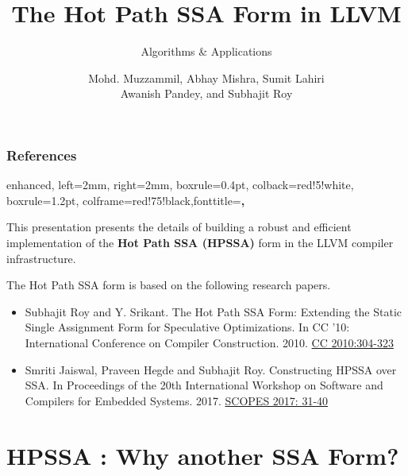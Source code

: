 \documentclass[aspectratio=169, compress]{beamer}
\title[Hot Path SSA in LLVM] %
{The Hot Path SSA Form in LLVM}
\subtitle{Algorithms \& Applications}
\author[Muzzammil, Mishra, Lahiri, Pandey, and Roy] %
{Mohd. Muzzammil\inst{1}, Abhay Mishra\inst{1}, Sumit Lahiri\inst{1} \\ Awanish Pandey\inst{2}, and Subhajit Roy\inst{1}}
\institute[IDK] %
{
	\inst{1}%
	Dept. Of Computer Science \& Engineering,
	IIT Kanpur \\
	\inst{2}%
	Qualcomm
}
\date[01/03/2022] %
\begin{document}
\frame{\titlepage}
\begin{frame}
	\frametitle{References}
	\tcbset
	{
		enhanced,
		left=2mm,
		right=2mm,
		boxrule=0.4pt,
		colback=red!5!white,
		boxrule=1.2pt,
		colframe=red!75!black,fonttitle=\bfseries,
	}
	\begin{tcolorbox}[colback=red!3!white,colframe=red!50!black,lifted shadow={1mm}{-2mm}{3mm}{0.1mm}{black!50!white}]
	This presentation presents the details of building a robust and efficient implementation of the \textbf{Hot Path SSA (HPSSA)} form in the LLVM compiler infrastructure. 
	\end{tcolorbox}
	\pause \vspace{10pt}
	The Hot Path SSA form is based on the following research papers.
	\vspace{15pt}
	\begin{itemize}
		\setlength\itemsep{1em} 
		\item Subhajit Roy and Y. Srikant. The Hot Path SSA Form: Extending the Static Single Assignment Form for Speculative Optimizations. In CC '10: International Conference on Compiler Construction. 2010. \href{https://link.springer.com/chapter/10.1007/978-3-642-11970-5_17}{CC 2010:304-323} 
		\item Smriti Jaiswal, Praveen Hegde and Subhajit Roy. Constructing HPSSA over SSA. In Proceedings of the 20th International Workshop on Software and Compilers for Embedded Systems. 2017.
		\href{https://dl.acm.org/doi/10.1145/3078659.3078660}{SCOPES 2017: 31-40}
	\end{itemize}
\end{frame}
\footnotesize
\section{HPSSA : Why another SSA Form?}
\end{document}
